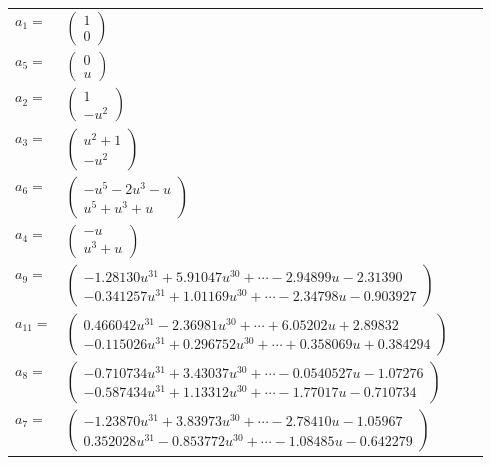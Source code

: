 \documentclass[1p]{elsarticle_modified}
\theoremstyle{definition}
\begin{document}
\begin{tabular}{m{7pt} m{180pt} m{7pt} m{180pt} }
\flushright $a_{1}=$&$\begin{pmatrix}1\\0\end{pmatrix}$ \\
\flushright $a_{5}=$&$\begin{pmatrix}0\\u\end{pmatrix}$ \\
\flushright $a_{2}=$&$\begin{pmatrix}1\\- u^2\end{pmatrix}$ \\
\flushright $a_{3}=$&$\begin{pmatrix}u^2+1\\- u^2\end{pmatrix}$ \\
\flushright $a_{6}=$&$\begin{pmatrix}- u^5-2 u^3- u\\u^5+u^3+u\end{pmatrix}$ \\
\flushright $a_{4}=$&$\begin{pmatrix}- u\\u^3+u\end{pmatrix}$ \\
\flushright $a_{9}=$&$\begin{pmatrix}-1.28130 u^{31}+5.91047 u^{30}+\cdots-2.94899 u-2.31390\\-0.341257 u^{31}+1.01169 u^{30}+\cdots-2.34798 u-0.903927\end{pmatrix}$ \\
\flushright $a_{11}=$&$\begin{pmatrix}0.466042 u^{31}-2.36981 u^{30}+\cdots+6.05202 u+2.89832\\-0.115026 u^{31}+0.296752 u^{30}+\cdots+0.358069 u+0.384294\end{pmatrix}$ \\
\flushright $a_{8}=$&$\begin{pmatrix}-0.710734 u^{31}+3.43037 u^{30}+\cdots-0.0540527 u-1.07276\\-0.587434 u^{31}+1.13312 u^{30}+\cdots-1.77017 u-0.710734\end{pmatrix}$ \\
\flushright $a_{7}=$&$\begin{pmatrix}-1.23870 u^{31}+3.83973 u^{30}+\cdots-2.78410 u-1.05967\\0.352028 u^{31}-0.853772 u^{30}+\cdots-1.08485 u-0.642279\end{pmatrix}$ \\

\end{tabular}
\end{document}
